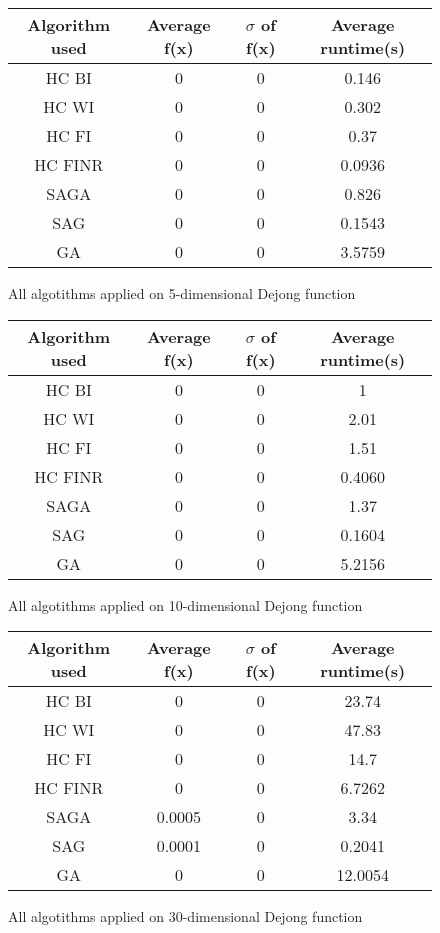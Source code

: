 \documentclass{article}
\begin{document}
\begin{figure}[H]
	\begin{tabular}{|c||c|c|c|} \hline
		Algorithm used & Average f(x) & $\sigma$ of f(x) & Average runtime(s) \\ \hline \hline
		HC BI & 0 & 0 & 0.146 \\ \hline
		HC WI & 0 & 0 & 0.302 \\ \hline
		HC FI & 0 & 0 & 0.37 \\ \hline
		HC FINR & 0 & 0 & 0.0936 \\ \hline
		SAGA & 0 & 0 & 0.826 \\ \hline
		SAG & 0 & 0 & 0.1543 \\ \hline
        GA & 0 & 0 & 3.5759 \\ \hline
\end{tabular}
\caption{All algotithms applied on 5-dimensional Dejong function}
\end{figure}

\begin{figure}[H]
	\begin{tabular}{|c||c|c|c|} \hline
		Algorithm used & Average f(x) & $\sigma$ of f(x) & Average runtime(s) \\ \hline \hline
		HC BI & 0 & 0 & 1 \\ \hline
		HC WI & 0 & 0 & 2.01 \\ \hline
		HC FI & 0 & 0 & 1.51 \\ \hline
		HC FINR & 0 & 0 & 0.4060 \\ \hline
		SAGA & 0 & 0 & 1.37 \\ \hline
		SAG & 0 & 0 & 0.1604 \\ \hline
        GA & 0 & 0 & 5.2156 \\ \hline
\end{tabular}
\caption{All algotithms applied on 10-dimensional Dejong function}
\end{figure}

\begin{figure}[H]
	\begin{tabular}{|c||c|c|c|} \hline
		Algorithm used & Average f(x) & $\sigma$ of f(x) & Average runtime(s) \\ \hline \hline
		HC BI & 0 & 0 & 23.74 \\ \hline
		HC WI & 0 & 0 & 47.83 \\ \hline
		HC FI & 0 & 0 & 14.7 \\ \hline
		HC FINR & 0 & 0 & 6.7262 \\ \hline
		SAGA & 0.0005 & 0 & 3.34 \\ \hline
		SAG & 0.0001 & 0 & 0.2041 \\ \hline
        GA & 0 & 0 & 12.0054 \\ \hline
\end{tabular}
\caption{All algotithms applied on 30-dimensional Dejong function}
\end{figure}
\end{document}

